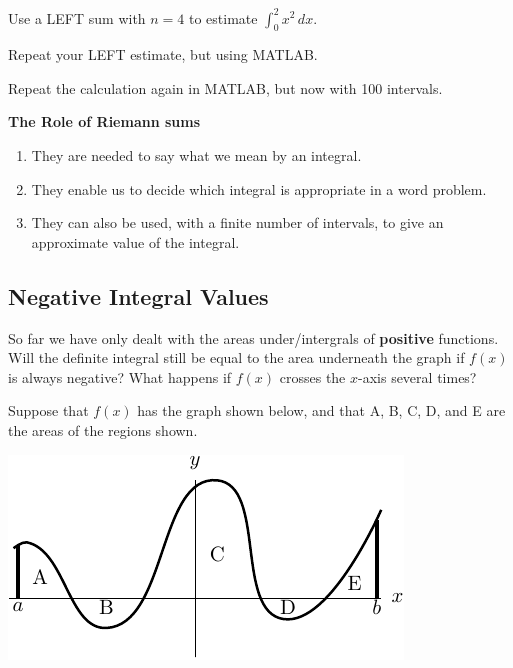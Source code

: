 \newpage
\problem Use a LEFT sum with $n=4$ to estimate
$\displaystyle \int_{0}^{2}x^2\,dx$.

\vfill
\vfill

Repeat your LEFT estimate, but using MATLAB.

\vfill Repeat the calculation again in MATLAB, but now with 100
intervals.

\vfill

\newpage
\begin{boxnote}
{\bf The Role of Riemann sums}
\begin{enumerate}
\item They are needed to say what we mean by an integral. \\[2ex]
\item They enable us to decide which integral is appropriate in a word
problem. \\[2ex]
\item They can also be used, with a finite number of intervals, to
  give an approximate value of the integral. \\[1ex]
\end{enumerate}
\end{boxnote}

\vspace{0.5in}

\subsection*{Negative Integral Values}

So far we have only dealt with the areas under/intergrals of {\bf
  positive} functions.  Will the definite integral still be equal to
the area underneath the graph if $f(x)$ is always negative?  What
happens if $f(x)$ crosses the $x$-axis several times?



\problem Suppose that $f(x)$ has the graph shown below, and that A, B,
  C, D, and E are the areas of the regions shown.

\begin{center}
\includegraphics[width=0.6\linewidth]{graphics/notes_04_negative_area_example}
\end{center}


